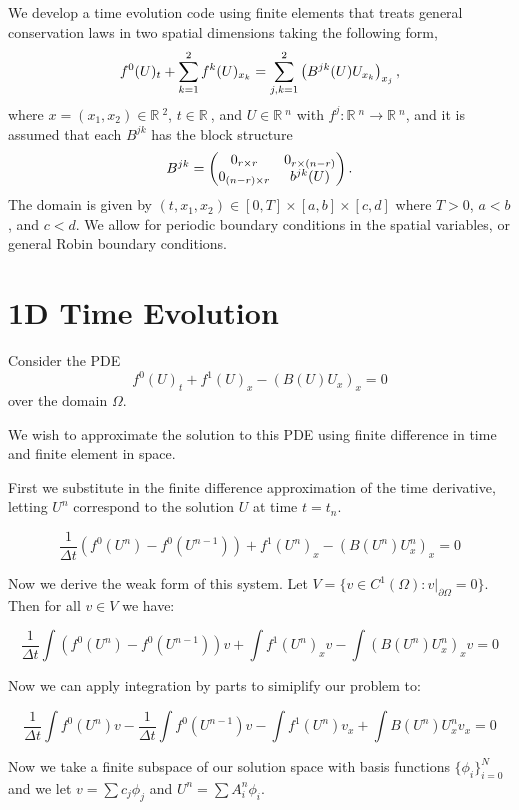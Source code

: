 \documentclass{article}
\newcommand{\R}{\mathbb{R}\ }
\begin{document}
We develop a time evolution code using finite elements that treats general conservation laws in two spatial dimensions taking the following form,
\begin{equation}
f^0(U)_t+\sum_{k=1}^2 f^k(U)_{x_k}= \sum_{j,k=1}^2\left( B^{jk}(U)U_{x_k}\right)_{x_j}, 
\notag
\end{equation}
where $x = (x_1,x_2)\in \R^2$, $t\in \R$, and $U\in \R^n$ with $f^j:\R^n\to \R^n$, and it is assumed that each $B^{jk}$ has the block structure
\begin{equation}
B^{jk}  = \begin{pmatrix}
0_{r\times r}&0_{r\times (n-r)}\\
0_{(n-r)\times r}&b^{jk}(U)
\end{pmatrix}.
\notag
\end{equation}
The domain is given by $(t,x_1,x_2)\in [0,T]\times [a,b]\times[c,d]$ where $T>0$, $a<b$, and $c<d$. We allow for periodic boundary conditions in the spatial variables, or general Robin boundary conditions.

\section{1D Time Evolution}
Consider the PDE
$$ f^0(U)_t + f^1(U)_x - (B(U)U_x)_x =0$$
over the domain $\Omega$.

We wish to approximate the solution to this PDE using finite difference in time and finite element in space.

First we substitute in the finite difference approximation of the time derivative, letting $U^n$ correspond to the solution $U$ at time $t= t_n$.

$$ \frac{1}{\Delta t}\left(f^0(U^{n})-f^0(U^{n-1})\right) + f^1(U^n)_x - (B(U^n)U_x^n)_x =0$$

Now we derive the weak form of this system. Let $V = \{v \in C^1(\Omega) : v|_{\partial \Omega} = 0\}$. Then for all $v\in V$ we have:

$$ \frac{1}{\Delta t}\int\left(f^0(U^{n})-f^0(U^{n-1})\right)v + \int f^1(U^n)_x v - \int (B(U^n)U_x^n)_xv =0$$

Now we can apply integration by parts to simiplify our problem to:

$$ \frac{1}{\Delta t}\int f^0(U^{n})v -\frac{1}{\Delta t}\int f^0(U^{n-1})v - \int f^1(U^n) v_x + \int B(U^n)U_x^nv_x  = 0$$

Now we take a finite subspace of our solution space with basis functions $\{\phi_i\}_{i=0}^N$ and we let $v = \sum c_j\phi_j$ and $U^n = \sum A_i^n \phi_i$.
\end{document}
